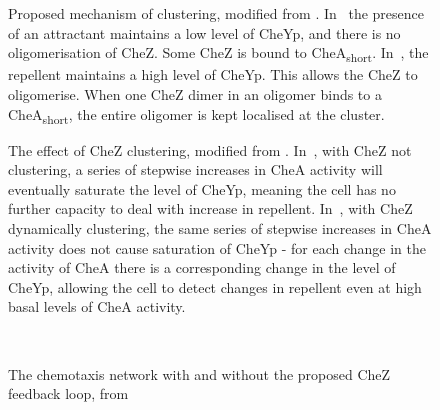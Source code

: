 \documentclass[../main.tex]{subfiles}
\begin{document}
\begin{figure}
\begin{center}
\caption[Proposed mechanism of clustering]{Proposed mechanism of clustering, modified from \citet{lipkow06}. In~ the presence of an attractant maintains a low level of CheYp, and there is no oligomerisation of CheZ. Some CheZ is bound to CheA\textsubscript{short}. In~, the repellent maintains a high level of CheYp. This allows the CheZ to oligomerise. When one CheZ dimer in an oligomer binds to a CheA\textsubscript{short}, the entire oligomer is kept localised at the cluster.}
\label{fig:intro:chemo}
\end{center}
\end{figure}
\begin{figure}
\begin{center}
\caption[Effect of CheZ clustering]{The effect of CheZ clustering, modified from \citet{lipkow06}. In~, with CheZ not clustering, a series of stepwise increases in CheA activity will eventually saturate the level of CheYp, meaning the cell has no further capacity to deal with increase in repellent. In~, with CheZ dynamically clustering, the same series of stepwise increases in CheA activity does not cause saturation of CheYp - for each change in the activity of CheA there is a corresponding change in the level of CheYp, allowing the cell to detect changes in repellent even at high basal levels of CheA activity.}
\label{fig:intro:chemo:clusternetwork}
\end{center}
\end{figure}

\begin{figure}
\begin{center}
\\
\caption[Modified chemotaxis network]{The chemotaxis network with and without the proposed CheZ feedback loop, from \citet{lipkowfigs}}
\label{fig:intro:netwok}
\end{center}
\end{figure}
\newpage
\end{document}
